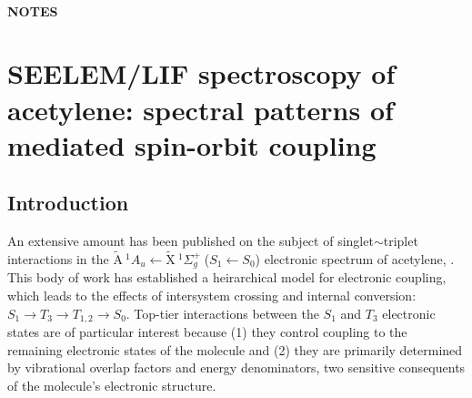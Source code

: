\documentclass[12pt,draft]{mitthesis}
\newcommand{\bigspace}{$
  \;
  $}
\newcommand{\AtoX}{$
  \tilde{\text{A}} \: ^1\!A_u 
  \leftarrow 
  \tilde{\text{X}} \: ^1\Sigma_g^+
  $}
\newcommand{\StoS}{$
  S_1 \leftarrow S_0
  $}
\begin{document}
\tableofcontents
\clearpage

\subsubsection*{NOTES}

\clearpage

\chapter{SEELEM/LIF spectroscopy of 
  acetylene: 
spectral patterns of mediated spin-orbit coupling
}

\section{Introduction}

An extensive amount has been published on the subject of
singlet$\sim$triplet interactions in the \AtoX \bigspace (\StoS)
electronic spectrum of acetylene, .  This body of work has
established a heirarchical model for electronic coupling, which leads
to the effects of intersystem crossing and internal conversion: $S_1
\rightarrow T_3 \rightarrow T_{1,2} \rightarrow S_0$.  Top-tier
interactions between the $S_1$ and $T_3$ electronic states are of
particular interest because (1) they control coupling to the remaining
electronic states of the molecule and (2) they are primarily
determined by vibrational overlap factors and energy denominators, two
sensitive consequents of the molecule's electronic structure.
\end{document}

